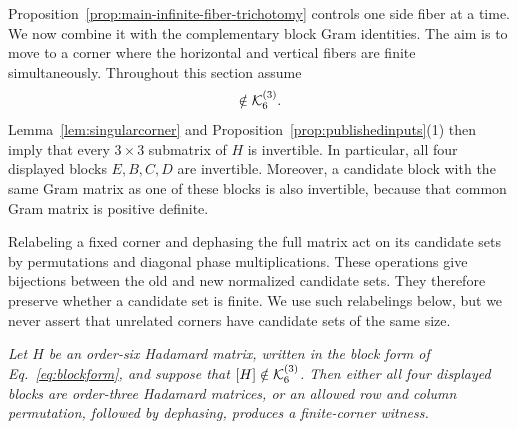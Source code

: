 {Proposition~\ref{prop:main-infinite-fiber-trichotomy} controls one side fiber at a time. We now combine it with the complementary block Gram identities. The aim is to move to a corner where the horizontal and vertical fibers are finite simultaneously.} Throughout this section assume
\begin{equation}
[H]\notin\KK_6^{(3)}.
\label{eq:outsideK}
\end{equation}
Lemma~\ref{lem:singularcorner} and Proposition~\ref{prop:publishedinputs}(1) then imply that every $3\times3$ submatrix of $H$ is invertible.  In particular, all four displayed blocks $E,B,C,D$ are invertible.  Moreover, a candidate block with the same Gram matrix as one of these blocks is also invertible, because that common Gram matrix is positive definite.

Relabeling a fixed corner and dephasing the full matrix act on its candidate sets by permutations and diagonal phase multiplications.  These operations give bijections between the old and new normalized candidate sets.  They therefore preserve whether a candidate set is finite.  We use such relabelings below, but we never assert that unrelated corners have candidate sets of the same size.

{\emph{Let $H$ be an order-six Hadamard matrix, written in the block form of Eq.~\eqref{eq:blockform}, and suppose that $[H]\notin\mathcal K_6^{(3)}$. Then either all four displayed blocks are order-three Hadamard matrices, or an allowed row and column permutation, followed by dephasing, produces a finite-corner witness.}}

